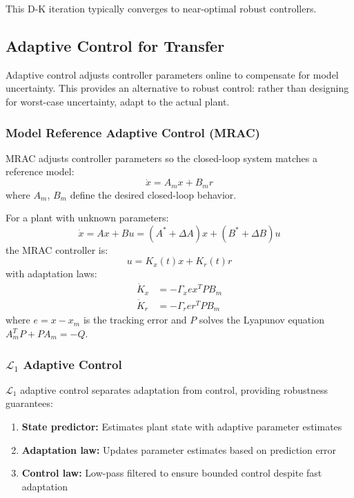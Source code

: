 This D-K iteration typically converges to near-optimal robust controllers.

\subsection{Adaptive Control for Transfer}

Adaptive control adjusts controller parameters online to compensate for model uncertainty. This provides an alternative to robust control: rather than designing for worst-case uncertainty, adapt to the actual plant.

\subsubsection{Model Reference Adaptive Control (MRAC)}

MRAC adjusts controller parameters so the closed-loop system matches a reference model:
\begin{equation}
\dot{x} = A_m x + B_m r
\end{equation}
where $A_m$, $B_m$ define the desired closed-loop behavior.

For a plant with unknown parameters:
\begin{equation}
\dot{x} = Ax + Bu = (A^* + \Delta A)x + (B^* + \Delta B)u
\end{equation}
the MRAC controller is:
\begin{equation}
u = K_x(t) x + K_r(t) r
\end{equation}
with adaptation laws:
\begin{align}
\dot{K}_x &= -\Gamma_x e x^T P B_m \\
\dot{K}_r &= -\Gamma_r e r^T P B_m
\end{align}
where $e = x - x_m$ is the tracking error and $P$ solves the Lyapunov equation $A_m^T P + PA_m = -Q$.

\subsubsection{$\mathcal{L}_1$ Adaptive Control}

$\mathcal{L}_1$ adaptive control separates adaptation from control, providing robustness guarantees:

\begin{enumerate}
    \item \textbf{State predictor:} Estimates plant state with adaptive parameter estimates
    \item \textbf{Adaptation law:} Updates parameter estimates based on prediction error
    \item \textbf{Control law:} Low-pass filtered to ensure bounded control despite fast adaptation
\end{enumerate}

